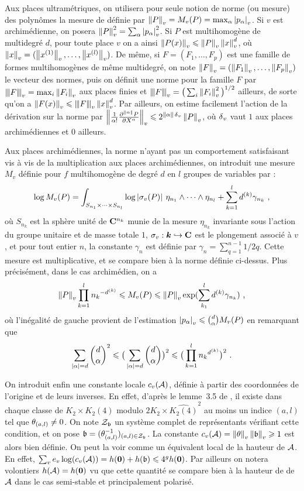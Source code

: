 Aux places ultramétriques, on utilisera pour seule notion de norme (ou mesure)
des polynômes la mesure de  définie par $\nv P = \mv P =
\max_\alpha \av{p_\alpha}$. Si $v$ est archimédienne, on posera $\nv P ^2 =
\sum_\alpha \av{p_\alpha}^2$. Si $P$ est multihomogène de multidegré $d$, pour
toute place $v$ on a ainsi $\nv {P(x)} \le \nv P \nv x ^d$, où $\nv x =
(\nv{x^{(1)}}, \dots , \nv{x^{(l)}})$. De même, si $F = (F_1, \dots, F_p)$ est
une famille de formes multihomogènes de même multidegré, on note $\nv F =
(\nv{F_1}, \dots, \nv{F_p})$ le vecteur des normes, puis on définit une norme
pour la famille $F$ par $\nnv F = \max_i \nv{F_i}$ aux places finies et $\nnv
F = \big(\sum_i \nv{F_i}^2 \big)^{1/2}$ ailleurs, de sorte qu'on a $\nv{F(x)}
\le \nnv F \nv x^d$. Par ailleurs, on estime facilement l'action de la
dérivation sur la norme par $\nv {\frac1 {\alpha !}
  \frac{\partial^{\lgt\alpha}P}{\partial X^\alpha}} \le 2^{\lgt\alpha \, \dv}
\nv P$, où $\dv$ vaut $1$ aux places archimédiennes et $0$ ailleurs.

Aux places archimédiennes, la norme n'ayant pas un comportement satisfaisant
vis à vis de la multiplication aux places archimédiennes, on introduit une
mesure $M_v$ définie pour $f$ multihomogène de degré $d$ en $l$ groupes de
variables par :
\[
  \log \mv P = \int_{S_{n_1} \times \cdots \times S_{n_l}} \log
  \av[]{\sigma_v(P)} \, \eta_{n_1}\wedge\cdots\wedge \eta_{n_l} + \sum_{k=1}^l
  d^{(k)} \gamma_{n_k} \pmm,
\]
où $S_{n_k}$ est la sphère unité de $\C^{n_k}$ munie de la mesure $\eta_{n_k}$
invariante sous l'action du groupe unitaire et de masse totale $1$, $\sigma_v
: \cdn \hookrightarrow \C$ est le plongement associé à $v$, et pour tout
entier $n$, la constante $\gamma_n$ est définie par $\gamma_n =
\sum_{q=1}^{n-1} 1/2q$. Cette mesure est multiplicative, et se compare bien à
la norme définie ci-dessus. Plus précisément, dans le cas archimédien, on a
\[
  \nv P  \prod_{k=1}^l {n_k}^{-d^{(k)}}
  \le \mv P
  \le \nv P \exp(\sum_{k_1}^l d^{(k)} \gamma_{n_k}) \pmm,
\]
où l'inégalité de gauche provient de l'estimation $\av{p_\alpha} \le
\binom{d}{\alpha} \mv P$ \cite[dém. du lemme~3.3]{remgdmp} en remarquant que
\[
 \sum_{\vlg\alpha = d} \binom{d}{\alpha}^2 \le \big(\sum_{\vlg\alpha = d}
 \binom{d}{\alpha}\big)^2 \le \big(\prod_{k=1}^l {n_k}^{d^{(k)}}\big)^2 \pmm.
\]

On introduit enfin une constante locale $c_v(\A)$, définie à partir des
coordonnées de l'origine et de leurs inverses. En effet, d'après le lemme~3.5
de \cite{daphiminvaii}, il existe dans chaque classe de $K_2 \times
\widehat{K_2(4)}$ modulo $2K_2 \times \widehat{K_2(4)}^2$ au moins un indice
$(a, l)$ tel que $\coa_{(a,l)} \neq 0$. On note $\mathcal{Z}_\BA$ un système
complet de représentants vérifiant cette condition, et on pose $\BA =
(\coa_{(a, l)}^{-1})_{(a, l) \in \mathcal{Z}_\BA}$. La constante $c_v(\A) =
\nv{\coa}\nv{\BA} \ge 1$ est alors bien définie. On peut la voir comme un
équivalent local de la hauteur de $\A$. En effet, $\sum_v e_v \log (c_v(\A)) =
h(\OA) + h(\BA) \le 4^g h(\OA)$. Par ailleurs on notera volontiers $h(\A) =
h(\OA)$ vu que cette quantité se compare bien à la hauteur de 
de $\A$ dans le cas semi-stable et principalement polarisé.

